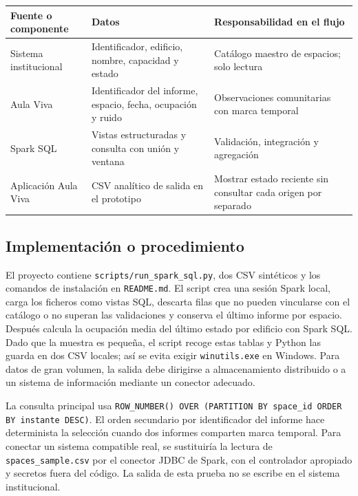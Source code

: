 \documentclass[a4paper,12pt]{article}
\begin{document}
\begin{center}\small
\begin{tabularx}{\textwidth}{lXX}\toprule
Fuente o componente & Datos & Responsabilidad en el flujo\\\midrule
Sistema institucional & Identificador, edificio, nombre, capacidad y estado & Catálogo maestro de espacios; solo lectura\\
Aula Viva & Identificador del informe, espacio, fecha, ocupación y ruido & Observaciones comunitarias con marca temporal\\
Spark SQL & Vistas estructuradas y consulta con unión y ventana & Validación, integración y agregación\\
Aplicación Aula Viva & CSV analítico de salida en el prototipo & Mostrar estado reciente sin consultar cada origen por separado\\\bottomrule
\end{tabularx}\end{center}

\subsection{Implementación o procedimiento}
El proyecto contiene \texttt{scripts/run\_spark\_sql.py}, dos CSV sintéticos y los comandos de instalación en \texttt{README.md}. El script crea una sesión Spark local, carga los ficheros como vistas SQL, descarta filas que no pueden vincularse con el catálogo o no superan las validaciones y conserva el último informe por espacio. Después calcula la ocupación media del último estado por edificio con Spark SQL. Dado que la muestra es pequeña, el script recoge estas tablas y Python las guarda en dos CSV locales; así se evita exigir \texttt{winutils.exe} en Windows. Para datos de gran volumen, la salida debe dirigirse a almacenamiento distribuido o a un sistema de información mediante un conector adecuado.

La consulta principal usa \texttt{ROW\_NUMBER() OVER (PARTITION BY space\_id ORDER BY instante DESC)}. El orden secundario por identificador del informe hace determinista la selección cuando dos informes comparten marca temporal. Para conectar un sistema compatible real, se sustituiría la lectura de \texttt{spaces\_sample.csv} por el conector JDBC de Spark, con el controlador apropiado y secretos fuera del código. La salida de esta prueba no se escribe en el sistema institucional.
\end{document}
